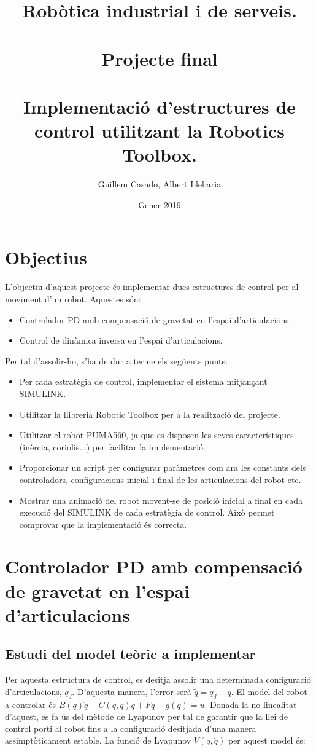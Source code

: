 \documentclass[]{article}
\title{Robòtica industrial i de serveis. \\~\\ Projecte final \\~\\ Implementació d'estructures de control utilitzant la Robotics Toolbox. }
\author{Guillem Casado, Albert Llebaria}
\date{Gener 2019}
\begin{document}
\maketitle

\section{Objectius}

L'objectiu d'aquest projecte és implementar dues estructures de control per al moviment d'un robot. Aquestes són: 

\begin{itemize}
\item Controlador PD amb compensació de gravetat en l'espai d'articulacions. 
\item Control de dinàmica inversa en l'espai d'articulacions.
\end{itemize}

Per tal d'assolir-ho, s'ha de dur a terme els següents punts:

\begin{itemize}
\item Per cada estratègia de control, implementar el sistema mitjançant SIMULINK. 
\item Utilitzar la llibreria Robotic Toolbox per a la realització del projecte. 
\item Utilitzar el robot PUMA560, ja que es disposen les seves característiques (inèrcia, coriolis...) per facilitar la implementació. 
\item Proporcionar un script per configurar paràmetres com ara les constants dels controladors, configuracions inicial i final de les articulacions del robot etc.
\item Mostrar una animació del robot movent-se de posició inicial a final en cada execució del SIMULINK de cada estratègia de control. Això permet comprovar que la implementació és correcta. 
\end{itemize}

\section{Controlador PD amb compensació de gravetat en l'espai d'articulacions}

\subsection{Estudi del model teòric a implementar}
Per aquesta estructura de control, es desitja assolir una determinada configuració d'articulacions, $q_{d}$. D'aquesta manera, l'error serà $\tilde{q} = q_{d} - q$. El model del robot a controlar és $B(q)\ddot{q} + C(q, \dot{q})\dot{q} + F\dot{q} + g(q) = u$. Donada la no linealitat d'aquest, es fa ús del mètode de Lyapunov per tal de garantir que la llei de control porti al robot fins a la configuració desitjada d'una manera assimptòticament estable. La funció de Lyapunov $V(q, \dot{q})$ per aquest model és: \\
\end{document}
